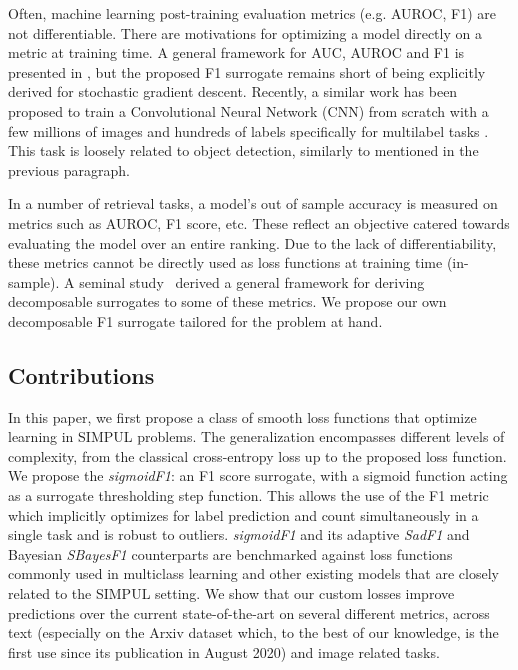 Often, machine learning post-training evaluation metrics (e.g. AUROC, F1) are
not differentiable. There are motivations  for
optimizing a model directly on a metric at training time. A general framework
for AUC, AUROC and F1 is presented in \cite{optimizableLosses}, but the
proposed F1 surrogate remains short of being explicitly derived for stochastic
gradient descent. Recently, a similar work has been proposed to train a
Convolutional Neural Network (CNN) from scratch with a few millions of images
and hundreds of labels specifically for multilabel tasks \cite{tencent}. This
task is loosely related to object detection, similarly to
\cite{multitaskLabelImages} mentioned in the previous paragraph.


In a number of retrieval tasks, a model's out of sample accuracy is measured
on metrics such as AUROC, F1 score, etc. These reflect an objective catered
towards evaluating the model over an entire ranking. Due to the lack of
differentiability, these metrics cannot be directly used as loss functions at
training time (in-sample). A seminal study~\cite{optimizableLosses} derived a
general framework for deriving decomposable surrogates to some of these
metrics. We propose our own decomposable F1 surrogate tailored for the problem
at hand.

\subsection{Contributions}
In this paper, we first propose a class of smooth loss functions that optimize
learning in SIMPUL problems. The generalization encompasses different levels
of complexity, from the classical cross-entropy loss up to the proposed loss
function. We propose the \emph{sigmoidF1}: an F1 score surrogate, with a
sigmoid function acting as a surrogate thresholding step function. This allows
the use of the F1 metric which implicitly optimizes for label prediction and
count simultaneously in a single task and is robust to outliers.
\emph{sigmoidF1} and its adaptive \emph{SadF1} and Bayesian \emph{SBayesF1}
counterparts are benchmarked against loss functions commonly used in
multiclass learning and other existing models that are closely related to the
SIMPUL setting. We show that our custom losses improve predictions over the
current  state-of-the-art on several different metrics, across text
(especially on the Arxiv dataset which, to the best of our knowledge, is the
first use since its publication in August 2020) and image related tasks.

